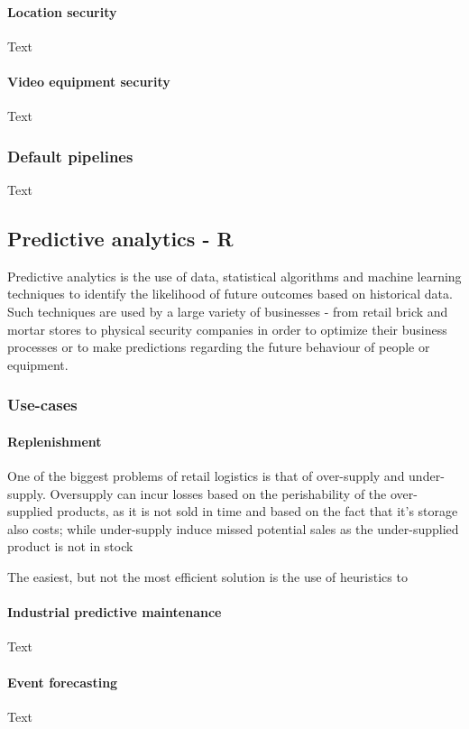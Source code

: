 \documentclass{article}
\begin{document}
\paragraph{Location security}
Text
\paragraph{Video equipment security}
Text

\subsubsection{Default pipelines}
Text

\subsection{Predictive analytics - R}
Predictive analytics is the use of data, statistical algorithms and machine learning techniques to identify the likelihood of future outcomes based on historical data. Such techniques are used by a large variety of businesses - from retail brick and mortar stores to physical security companies in order to optimize their business processes or to make predictions regarding the future behaviour of people or equipment.

\subsubsection{Use-cases}

\paragraph{Replenishment}
One of the biggest problems of retail logistics is that of over-supply and under-supply. Oversupply can incur losses based on the perishability of the over-supplied products, as it is not sold in time and based on the fact that it's storage also costs; while under-supply induce missed potential sales as the under-supplied product is not in stock

The easiest, but not the most efficient solution is the use of heuristics to 

\paragraph{Industrial predictive maintenance}
Text
\paragraph{Event forecasting}
Text
\end{document}
